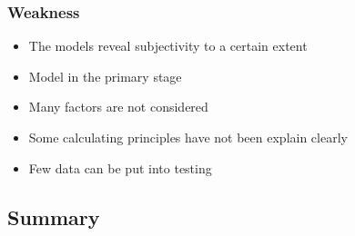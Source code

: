 \subsubsection*{Weakness}
\begin{itemize}
	\item {The models reveal subjectivity to a certain extent}
	\item {Model in the primary stage}
	\item {Many factors are not considered }
	\item {Some calculating principles have not been explain clearly}
	\item {Few data can be put into testing}
	
\end{itemize}
\subsection{Summary}



